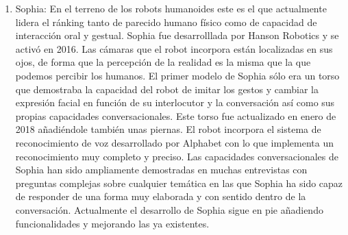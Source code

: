 \begin{enumerate}
  \item Sophia: En el terreno de los robots humanoides este es el que actualmente lidera el ránking tanto de parecido humano físico como de capacidad de interacción oral y gestual. Sophia fue desarrolllada por Hanson Robotics y se activó en 2016. Las cámaras que el robot incorpora están localizadas en sus ojos, de forma que la percepción de la realidad es la misma que la que podemos percibir los humanos. El primer modelo de Sophia sólo era un torso que demostraba la capacidad del robot de imitar los gestos y cambiar la expresión facial en función de su interlocutor y la conversación así como sus propias capacidades conversacionales. Este torso fue actualizado en enero de 2018 añadiéndole también unas piernas. El robot incorpora el sistema de reconocimiento de voz desarrollado por Alphabet con lo que implementa un reconocimiento muy completo y preciso. Las capacidades conversacionales de Sophia han sido ampliamente demostradas en muchas entrevistas con preguntas complejas sobre cualquier temática en las que Sophia ha sido capaz de responder de una forma muy elaborada y con sentido dentro de la conversación. Actualmente el desarrollo de Sophia sigue en pie añadiendo funcionalidades y mejorando las ya existentes.
\end{enumerate}
